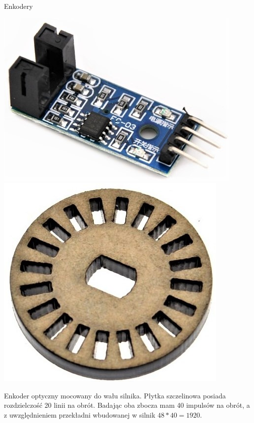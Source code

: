 \begin{frame}
\begin{block}{Enkodery}
	\begin{minipage}{0.39\textwidth}
\begin{center}
	\includegraphics[scale=0.2]{enkoder.jpg}\hspace{12mm}
	\includegraphics[scale=0.1]{plytkaEnkodera.jpg}   
\end{center}
\end{minipage}
\begin{minipage}{0.59\textwidth}
	Enkoder optyczny mocowany do wału silnika. Płytka szczelinowa posiada rozdzielczość 20 linii na obrót. Badając oba zbocza mam 40 impulsów na obrót, a z uwzględnieniem przekładni wbudowanej w silnik $48 * 40 = 1920$. 
\end{minipage}
\end{block}



\end{frame}

